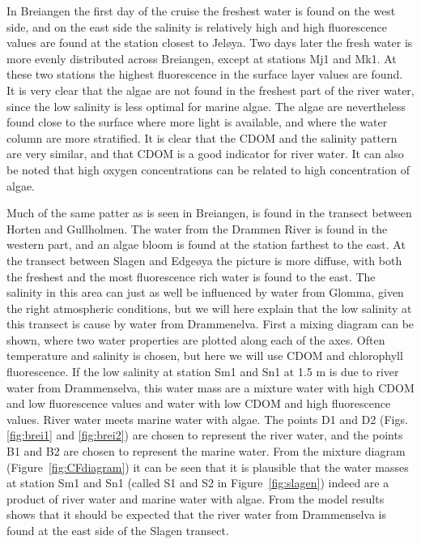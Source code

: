 \documentclass[12pt,a4paper,english]{article}
\begin{document}
In Breiangen the first day of the cruise the freshest water is found on the west 
side, and on the east side the salinity is relatively high and high fluorescence 
values are found at the station closest to Jel{\o}ya. 
Two days later the fresh water is more evenly distributed across Breiangen, 
except at stations Mj1 and Mk1. At these two stations the highest fluorescence 
in the surface layer values are found. It is very clear that the algae are not 
found in the freshest part of the river water, since the low salinity is less 
optimal for marine algae. The algae are nevertheless found close to the surface 
where more light is available, and where the water column are more stratified. 
It is clear that the CDOM and the salinity pattern are very similar, and that 
CDOM is a good indicator for river water. It can also be noted that high oxygen 
concentrations can be related to high concentration of algae. 

Much of the same patter as is seen in Breiangen, is found in the transect 
between Horten and Gullholmen. The water from the Drammen River is found in 
the western part, and an algae bloom is found at the station farthest to the east. 
At the transect between Slagen and Edge{\o}ya the picture is more diffuse, with both 
the freshest and the most fluorescence rich water is found to the east. 
The salinity in this area can just as well be influenced by water from Glomma, 
given the right atmospheric conditions, but we will here explain that the low 
salinity at this transect is cause by water from Drammenelva. 
First a mixing diagram can be shown, where two water properties are plotted 
along each of the axes. Often temperature and salinity is chosen, 
but here we will use CDOM and chlorophyll fluorescence. 
If the low salinity at station Sm1 and Sn1 at 1.5 m is due to river water from 
Drammenselva, this water mass are a mixture water with high CDOM and low 
fluorescence values and water with low CDOM and high fluorescence values. 
River water meets marine water with algae. 
The points D1 and D2 (Figs. \ref{fig:brei1} and \ref{fig:brei2}) are chosen to 
represent the river water, 
and the points B1 and B2 are chosen to represent the marine water. 
From the mixture diagram (Figure~\ref{fig:CFdiagram}) it can be seen that it is 
plausible that the water masses at station Sm1 and Sn1 
(called S1 and S2 in Figure~\ref{fig:slagen}) indeed are a 
product of river water and marine water with algae. 
From the model results shows that it should be expected that the river 
water from Drammenselva is found at the east side of the Slagen transect. 
\end{document}
